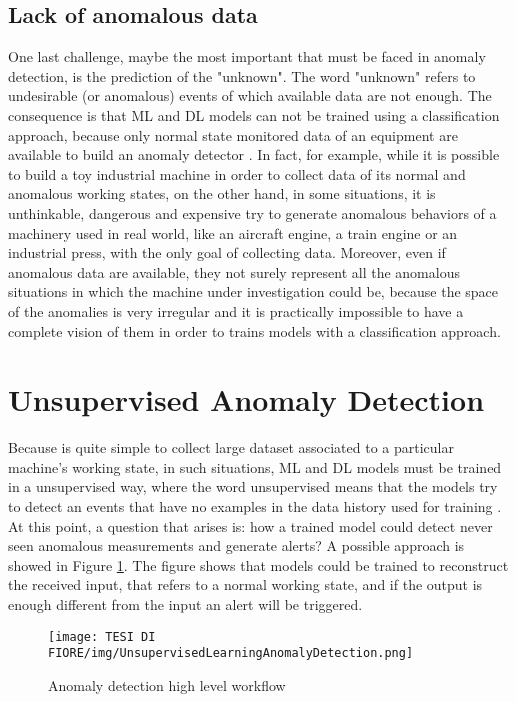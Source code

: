 \subsection{Lack of anomalous data}
One last challenge, maybe the most important that must be faced in anomaly detection, is the prediction of the "unknown". The word "unknown" refers to undesirable (or anomalous) events of which available data are not enough. The consequence is that ML and DL models can not be trained using a classification approach, because only normal state monitored data of an equipment are available to build an anomaly detector \cite{7AnomalyDetectionUnsupervised}. In fact, for example, while it is possible to build a toy industrial machine in order to collect data of its normal and anomalous working states, on the other hand, in some situations, it is unthinkable, dangerous and expensive try to generate anomalous behaviors of a machinery used in real world, like an aircraft engine, a train engine or an industrial press, with the only goal of collecting data. Moreover, even if anomalous data are available, they not surely represent all the anomalous situations in which the machine under investigation could be, because the space of the anomalies is very irregular and it is practically impossible to have a complete vision of them in order to trains models with a classification approach.

\section{Unsupervised Anomaly Detection}
Because is quite simple to collect large dataset associated to a particular machine's working state, in such situations, ML and DL models must be trained in a unsupervised way, where the word unsupervised means that the models try to detect an events that have no examples in the data history used for training \cite{8AnomalyDetectionUnsupervised2}. At this point, a question that arises is: how a trained model could detect never seen anomalous measurements and generate alerts? A possible approach is showed in Figure \ref{scoring_system_approach}. The figure shows that models could be trained to reconstruct the received input, that refers to a normal working state, and if the output is enough different from the input an alert will be triggered.

\begin{figure}[ht]
\texttt{[image: TESI DI FIORE/img/UnsupervisedLearningAnomalyDetection.png]}
\centering
\caption{Anomaly detection high level workflow \cite{7AnomalyDetectionUnsupervised}}
\label{scoring_system_approach}
\end{figure}

